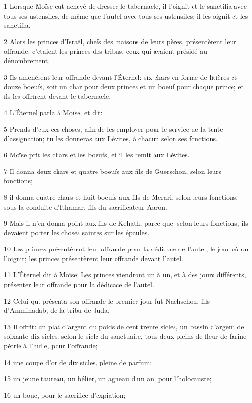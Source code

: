 \par 1 Lorsque Moïse eut achevé de dresser le tabernacle, il l'oignit et le sanctifia avec tous ses ustensiles, de même que l'autel avec tous ses ustensiles; il les oignit et les sanctifia.
\par 2 Alors les princes d'Israël, chefs des maisons de leurs pères, présentèrent leur offrande: c'étaient les princes des tribus, ceux qui avaient présidé au dénombrement.
\par 3 Ils amenèrent leur offrande devant l'Éternel: six chars en forme de litières et douze boeufs, soit un char pour deux princes et un boeuf pour chaque prince; et ils les offrirent devant le tabernacle.
\par 4 L'Éternel parla à Moïse, et dit:
\par 5 Prends d'eux ces choses, afin de les employer pour le service de la tente d'assignation; tu les donneras aux Lévites, à chacun selon ses fonctions.
\par 6 Moïse prit les chars et les boeufs, et il les remit aux Lévites.
\par 7 Il donna deux chars et quatre boeufs aux fils de Guerschon, selon leurs fonctions;
\par 8 il donna quatre chars et huit boeufs aux fils de Merari, selon leurs fonctions, sous la conduite d'Ithamar, fils du sacrificateur Aaron.
\par 9 Mais il n'en donna point aux fils de Kehath, parce que, selon leurs fonctions, ils devaient porter les choses saintes sur les épaules.
\par 10 Les princes présentèrent leur offrande pour la dédicace de l'autel, le jour où on l'oignit; les princes présentèrent leur offrande devant l'autel.
\par 11 L'Éternel dit à Moïse: Les princes viendront un à un, et à des jours différents, présenter leur offrande pour la dédicace de l'autel.
\par 12 Celui qui présenta son offrande le premier jour fut Nachschon, fils d'Amminadab, de la tribu de Juda.
\par 13 Il offrit: un plat d'argent du poids de cent trente sicles, un bassin d'argent de soixante-dix sicles, selon le sicle du sanctuaire, tous deux pleins de fleur de farine pétrie à l'huile, pour l'offrande;
\par 14 une coupe d'or de dix sicles, pleine de parfum;
\par 15 un jeune taureau, un bélier, un agneau d'un an, pour l'holocauste;
\par 16 un bouc, pour le sacrifice d'expiation;
